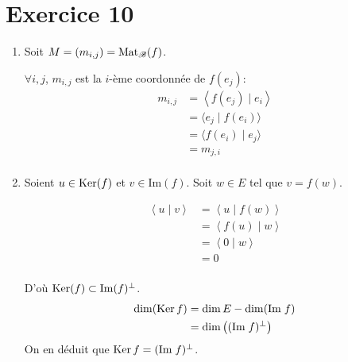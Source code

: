 \part{Exercice 10}

\begin{enumerate}
	\item Soit $M = (m_{i,j}) = \operatorname{Mat}_{\mathcal{B}}(f)$.

		$\forall i,j$, $m_{i,j}$ est la $i$-ème coordonnée de $f(e_j)$:
		\begin{align*}
			m_{i,j} &= \left<f(e_j)  \mid e_i \right> \\
			&= \langle e_j  \mid f(e_i)\rangle \\
			&= \langle f(e_i)  \mid e_j \rangle\\
			&= m_{j,i} \\
		\end{align*}
	\item Soient $u \in \operatorname{Ker}(f)$ et $v \in \mathrm{Im}(f)$. Soit $w \in E$ tel que $v = f(w)$.

		\begin{align*}
			\left<u \mid v \right> &= \left<u \mid f(w) \right> \\
			&= \left<f(u) \mid w \right> \\
			&= \left<0 \mid w \right> \\
			&= 0 \\
		\end{align*}

		D'où $\operatorname{Ker}(f) \subset \mathrm{Im}(f)^\perp$.
		\begin{align*}
			\dim(\operatorname{Ker} f) &= \dim E - \dim(\mathrm{Im}\;f) \\
			&= \dim\big((\mathrm{Im}\;f)^\perp\big) \\
		\end{align*}
		On en déduit que $\operatorname{Ker} f = (\mathrm{Im}\;f)^\perp$.
\end{enumerate}

